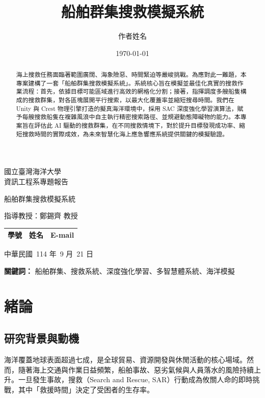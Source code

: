 \documentclass[12pt,a4paper]{ctexart}
\title{船舶群集搜救模擬系統}
\author{作者姓名}
\date{\today}
\begin{document}
\begin{titlepage}

	\centering
	\vspace*{2cm}
	
	{\Large 國立臺灣海洋大學\\[0.5cm]資訊工程系專題報告 \par}
	
	\vspace*{1cm}
	{\Huge 船舶群集搜救模擬系統 \par}
	
	\vfill
	
	{\Large 指導教授：鄭錫齊 教授 \par}
	\vspace*{1cm}
	\begin{tabular}{lll}
	學號 & 姓名 & E-mail \\
	\hline
	\end{tabular}

	\vspace*{1cm}
	{\Large 中華民國\ 114 年\ 9 月\ 21 日 \par}

\end{titlepage}

\vspace*{0.3\textheight}
\begin{abstract}
海上搜救任務面臨著範圍廣闊、海象險惡、時間緊迫等嚴峻挑戰。為應對此一難題，本專案建構了一套「船舶群集搜救模擬系統」。系統核心旨在模擬並最佳化真實的搜救作業流程：首先，依據目標可能區域進行高效的網格化分割；接著，指揮調度多艘船隻構成的搜救群集，對各區塊展開平行搜索，以最大化覆蓋率並縮短搜尋時間。我們在 Unity 與 Crest 物理引擎打造的擬真海洋環境中，採用 SAC 深度強化學習演算法，賦予每艘搜救船隻在複雜風浪中自主執行精密搜索路徑、並規避動態障礙物的能力。本專案旨在評估此 AI 驅動的搜救群集，在不同搜救情境下，對於提升目標發現成功率、縮短搜救時間的實際成效，為未來智慧化海上應急響應系統提供關鍵的模擬驗證。
\end{abstract}

\centerline{\textbf{關鍵詞：} 船舶群集、搜救系統、深度強化學習、多智慧體系統、海洋模擬}

\newpage

\tableofcontents
\newpage

\section{緒論}

\subsection{研究背景與動機}
海洋覆蓋地球表面超過七成，是全球貿易、資源開發與休閒活動的核心場域。然而，隨著海上交通與作業日益頻繁，船舶事故、惡劣氣候與人員落水的風險持續上升。一旦發生事故，搜救（Search and Rescue, SAR）行動成為攸關人命的即時挑戰，其中「救援時間」決定了受困者的生存率。
\end{document}
